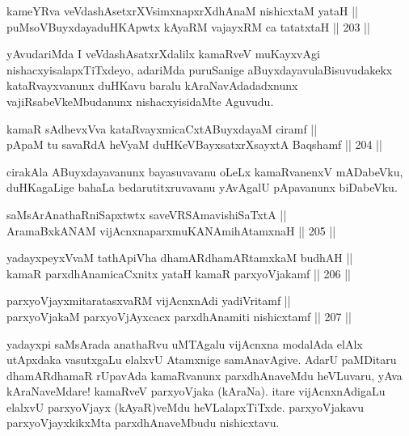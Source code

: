 
\begin{shl}
kameYRva veVdashAsetxrXV\s simxnapxrXdhAnaM nishicxtaM yataH || \\
puMsoV\s BuyxdayaduHKApwtx kAyaRM vajayxRM ca tatatxtaH \hfill || 203 ||  
\end{shl}

\begin{artha}
yAvudariMda I veVdashAsatxrXdalilx kamaRveV muKayxvAgi
nishacxyisalapxTiTxdeyo, adariMda puruSanige aBuyxdayavulaBisuvudakekx
kataRvayxvanunx duHKavu baralu kAraNavAdadadxnunx
vajiRsabeVkeMbudanunx nishacxyisidaMte Aguvudu.
\end{artha}

\begin{shl}
kamaR sAdhevxVva kataRvayxmicaCxtA\s BuyxdayaM ciramf || \\
pApaM tu savaRdA heVyaM duHKeVBayxsatxrXsayxtA Baqshamf \hfill || 204 ||  
\end{shl}

\begin{artha}
cirakAla ABuyxdayavanunx bayasuvavanu oLeLx kamaRvanenxV mADabeVku,
duHKagaLige bahaLa bedarutitxruvavanu yAvAgalU pApavanunx biDabeVku.
\end{artha}


\begin{shl}
saMsArAnathaRniSapxtwtx saveVRSAmavishiSaTxtA || \\
AramaBxkANAM vijAcnxnaparxmuKANAmihA\s \s tamxnaH \hfill || 205 ||  
\end{shl}

\begin{shl}
yadayxpeyxVvaM tathA\s piVha dhamARdhamARtamxkaM budhAH || \\
kamaR parxdhAnamicaCxnitx yataH kamaR parxyoVjakamf \hfill || 206 ||  
\end{shl}

\begin{shl}
parxyoVjayxmitaratasxvaRM vijAcnxnAdi yadiVritamf ||  \\
parxyoVjakaM parxyoVjAyxcacx parxdhAnamiti nishicxtamf \hfill || 207 ||  
\end{shl}

\begin{artha}
yadayxpi saMsArada anathaRvu uMTAgalu vijAcnxna modalAda elAlx
utApxdaka vasutxgaLu elalxvU Atamxnige samAnavAgive. AdarU paMDitaru
dhamARdhamaR rUpavAda kamaRvanunx parxdhAnaveMdu heVLuvaru, yAva
kAraNaveMdare! kamaRveV parxyoVjaka (kAraNa). itare vijAcnxnAdigaLu
elalxvU parxyoVjayx (kAyaR)veMdu heVLalapxTiTxde. parxyoVjakavu
parxyoVjayxkikxMta parxdhAnaveMbudu nishicxtavu.
\end{artha}

